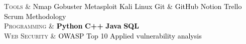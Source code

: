 
\begin{skills}
	\textsc{Tools} & \textcolor{black}{Nmap \textbullet{} Gobuster \textbullet{} Metasploit \textbullet{} Kali Linux \textbullet{} Git \& GitHub \textbullet{} Notion \textbullet{} Trello \textbullet{} Scrum Methodology} \\
    \emptySeparator
	\textsc{Programming} & \textcolor{black}{\textbf{Python} \textbullet{} \textbf{C++} \textbullet{} \textbf{Java} \textbullet{} \textbf{SQL}} \\
    \emptySeparator
	\textsc{Web Security} & \textcolor{black}{OWASP Top 10 \textbullet{} Applied vulnerability analysis}
\end{skills}